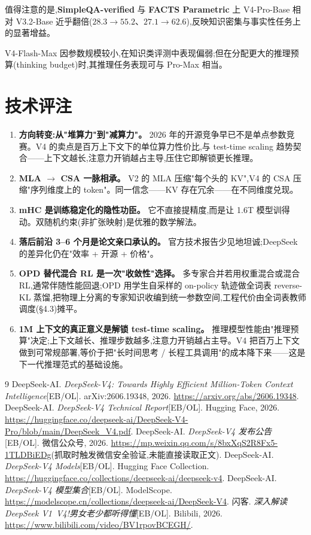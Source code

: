\documentclass{MathNoteCN}
\begin{document}
值得注意的是,\textbf{SimpleQA-verified} 与 \textbf{FACTS Parametric} 上 V4-Pro-Base 相对 V3.2-Base 近乎翻倍($28.3\to55.2$、$27.1\to62.6$),反映知识密集与事实性任务上的显著增益。

V4-Flash-Max 因参数规模较小,在知识类评测中表现偏弱;但在分配更大的推理预算(thinking budget)时,其推理任务表现可与 Pro-Max 相当\cite{arxiv}。

\section{技术评注}

\begin{enumerate}
  \item \textbf{方向转变:从"堆算力"到"减算力"。} 2026 年的开源竞争早已不是单点参数竞赛。V4 的卖点是百万上下文下的单位算力性价比,与 test-time scaling 趋势契合——上下文越长,注意力开销越占主导,压住它即解锁更长推理。
  \item \textbf{MLA $\to$ CSA 一脉相承。} V2 的 MLA 压缩"每个头的 KV",V4 的 CSA 压缩"序列维度上的 token"。同一信念——KV 存在冗余——在不同维度兑现。
  \item \textbf{mHC 是训练稳定化的隐性功臣。} 它不直接提精度,而是让 1.6T 模型训得动。双随机约束(非扩张映射)是优雅的数学解法。
  \item \textbf{落后前沿 3--6 个月是论文亲口承认的。} 官方技术报告少见地坦诚;DeepSeek 的差异化仍在"效率 + 开源 + 价格"。
  \item \textbf{OPD 替代混合 RL 是一次"收敛性"选择。} 多专家合并若用权重混合或混合 RL,通常伴随性能回退;OPD 用学生自采样的 on-policy 轨迹做全词表 reverse-KL 蒸馏,把物理上分离的专家知识收编到统一参数空间,工程代价由全词表教师调度(§4.3)摊平。
  \item \textbf{1M 上下文的真正意义是解锁 test-time scaling。} 推理模型性能由"推理预算"决定;上下文越长、推理步数越多,注意力开销越占主导。V4 把百万上下文做到可常规部署,等价于把"长时间思考 / 长程工具调用"的成本降下来——这是下一代推理范式的基础设施。
\end{enumerate}

\begin{thebibliography}{9}
 DeepSeek-AI. \textit{DeepSeek-V4: Towards Highly Efficient Million-Token Context Intelligence}[EB/OL]. arXiv:2606.19348, 2026. \url{https://arxiv.org/abs/2606.19348}.
 DeepSeek-AI. \textit{DeepSeek-V4 Technical Report}[EB/OL]. Hugging Face, 2026. \url{https://huggingface.co/deepseek-ai/DeepSeek-V4-Pro/blob/main/DeepSeek_V4.pdf}.
 DeepSeek-AI. \textit{DeepSeek-V4 发布公告}[EB/OL]. 微信公众号, 2026. \url{https://mp.weixin.qq.com/s/8bxXqS2R8Fx5-1TLDBiEDg}(抓取时触发微信安全验证,未能直接读取正文).
 DeepSeek-AI. \textit{DeepSeek-V4 Models}[EB/OL]. Hugging Face Collection. \url{https://huggingface.co/collections/deepseek-ai/deepseek-v4}.
 DeepSeek-AI. \textit{DeepSeek-V4 模型集合}[EB/OL]. ModelScope. \url{https://modelscope.cn/collections/deepseek-ai/DeepSeek-V4}.
 闪客. \textit{深入解读 DeepSeek V1~V4!男女老少都听得懂}[EB/OL]. Bilibili, 2026. \url{https://www.bilibili.com/video/BV1rpovBCEGH/}.
\end{thebibliography}
\end{document}
